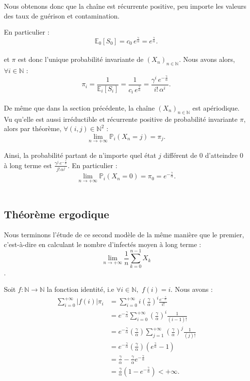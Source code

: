 \documentclass[12pt,a4paper]{report}
\theoremstyle{remark}
\begin{document}
Nous obtenons donc que la chaîne est récurrente positive, peu importe les valeurs des taux de guérison et contamination.

En particulier : $$\mathbb{E}_0[S_0] = c_0 \, e^{\frac{\gamma}{\alpha}} = e^{\frac{\gamma}{\alpha}}.$$\\

et $\pi$ est donc l'unique probabilité invariante de $(X_n)_{n \in \mathbb{N}}$. Nous avons alors, $\forall i \in \mathbb{N}$ :
$$\pi_i = \frac{1}{\mathbb{E}_i[S_i]} = \frac{1}{c_i \, e^{\frac{\gamma}{\alpha}}} = \frac{\gamma^i \, e^{-\frac{\gamma}{\alpha}}}{i! \, \alpha^i}.$$ \\

De même que dans la section précédente, la chaîne $(X_n)_{n \in \mathbb{N}}$ est apériodique. Vu qu'elle est aussi irréductible et récurrente positive de probabilité invariante $\pi$, alors par théorème, $\forall (i,j) \in \mathbb{N}^2$ :
$$\lim\limits_{n \to +\infty} \mathbb{P}_i(X_n = j) = \pi_j.$$

Ainsi, la probabilité partant de n’importe quel état $j$ différent de $0$ d’atteindre $0$ à long terme est $\frac{\gamma^j \, e^{-\frac{\gamma}{\alpha}}}{j! \, \alpha^j}$. En particulier :
$$\lim\limits_{n \to +\infty} \mathbb{P}_i(X_n = 0) = \pi_0 = e^{-\frac{\gamma}{\alpha}}.$$\\

\subsection{Théorème ergodique}

Nous terminons l'étude de ce second modèle de la même manière que le premier, c'est-à-dire en calculant le nombre d’infectés moyen à long terme : $$\lim\limits_{n \to +\infty} \frac{1}{n} \sum\limits_{k=0}^{n-1} X_k$$. 

Soit $f : \mathbb{N} \longrightarrow \mathbb{N}$ la fonction identité, i.e $\forall i \in \mathbb{N}, \, \, f(i) = i.$ Nous avons :
\begin{align*}
\sum_{i=0}^{+\infty} |f(i)| \pi_i &= \sum_{i=0}^{+\infty} i \left(\frac{\gamma}{\alpha}\right)^i \frac{e^{-\frac{\gamma}{\alpha}}}{i!} \\
&= e^{-\frac{\gamma}{\alpha}} \sum_{i=0}^{+\infty} \left(\frac{\gamma}{\alpha}\right)^i \frac{1}{(i-1)!} \\
&=  e^{-\frac{\gamma}{\alpha}} \left(\frac{\gamma}{\alpha}\right)  \sum_{j=1}^{+\infty} \left(\frac{\gamma}{\alpha}\right)^j \frac{1}{(j)!} \\
&= e^{-\frac{\gamma}{\alpha}} \left(\frac{\gamma}{\alpha}\right) \left(e^{\frac{\gamma}{\alpha}}
 - 1 \right) \\
&= \frac{\gamma}{\alpha} - \frac{\gamma}{\alpha} e^{-\frac{\gamma}{\alpha}} \\
&= \frac{\gamma}{\alpha} \left(1 - e^{-\frac{\gamma}{\alpha}}\right) < +\infty.
\end{align*}
\end{document}
